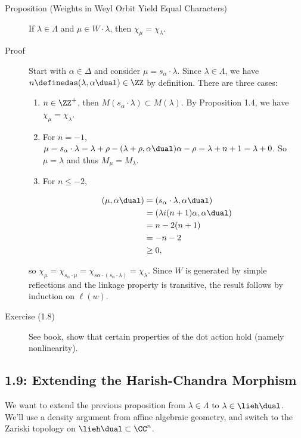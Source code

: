 \begin{description}
\item[Proposition (Weights in Weyl Orbit Yield Equal Characters)]
If \(\lambda \in \Lambda\) and \(\mu \in W\cdot \lambda\), then
\(\chi_\mu = \chi_\lambda\).
\item[Proof]
Start with \(\alpha \in \Delta\) and consider
\(\mu = s_\alpha \cdot \lambda\). Since \(\lambda \in \Lambda\), we have
\(n\definedas (\lambda ,\alpha\dual) \in \ZZ\) by definition. There are
three cases:

\begin{enumerate}
\def\labelenumi{\arabic{enumi}.}
\item
  \(n\in \ZZ^+\), then \(M(s_\alpha \cdot \lambda) \subset M(\lambda)\).
  By Proposition 1.4, we have \(\chi_\mu =\chi_\lambda\).
\item
  For \(n=-1\),
  \(\mu = s_\alpha \cdot \lambda = \lambda + \rho -(\lambda + \rho, \alpha\dual)\alpha - \rho = \lambda + n+1 = \lambda + 0\).
  So \(\mu = \lambda\) and thus \(M_\mu = M_\lambda\).
\item
  For \(n\leq -2\),
\end{enumerate}

\begin{align*}
(\mu, \alpha\dual) 
&= (s_\alpha \cdot \lambda , \alpha\dual) \\
&= (\lambda i (n+1)\alpha, \alpha\dual) \\
&= n - 2(n+1) \\
&= -n-2 \\
&\geq 0
,\end{align*}

so
\(\chi_\mu = \chi_{s_\alpha \cdot \mu} = \chi_{s\alpha \cdot (s_\alpha \cdot \lambda)} = \chi_\lambda\).
Since \(W\) is generated by simple reflections and the linkage property
is transitive, the result follows by induction on \(\ell(w)\).
\item[Exercise (1.8)]
See book, show that certain properties of the dot action hold (namely
nonlinearity).
\end{description}

\hypertarget{extending-the-harish-chandra-morphism}{%
\subsection{1.9: Extending the Harish-Chandra
Morphism}\label{extending-the-harish-chandra-morphism}}

We want to extend the previous proposition from \(\lambda \in \Lambda\)
to \(\lambda \in \lieh\dual\). We'll use a density argument from affine
algebraic geometry, and switch to the Zariski topology on
\(\lieh\dual \subset \CC^n\).

